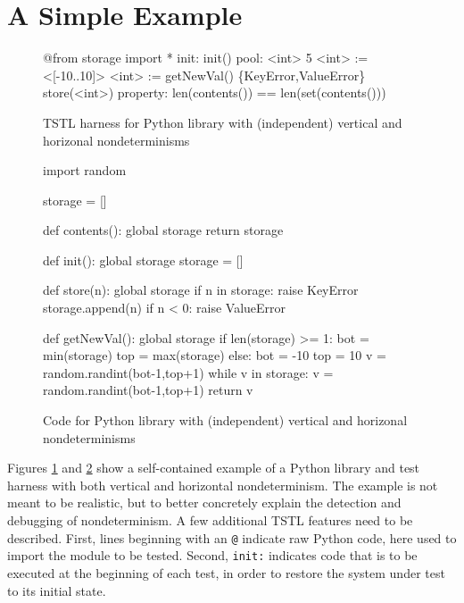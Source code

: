 \section{A Simple Example}

\begin{figure}
{\scriptsize
\begin{code}
@from storage import *
\vspace{0.1in}
init: init()
\vspace{0.1in}
pool: <int> 5
\vspace{0.1in}
<int> := <[-10..10]>
<int> := getNewVal()
\{KeyError,ValueError\} store(<int>)
\vspace{0.1in}
property: len(contents()) == len(set(contents()))
\end{code}
}
\caption{TSTL harness for Python library with (independent) vertical and
  horizonal nondeterminisms}
\label{fig:simpleexample}
\end{figure}

\begin{figure}[t]
  {\scriptsize
\begin{code}
import random

storage = []

def contents():
    global storage
    return storage

def init():
    global storage
    storage = []

def store(n):
    global storage
    if n in storage:
       raise KeyError
    storage.append(n)
    if n < 0:
       raise ValueError

def getNewVal():
    global storage
    if len(storage) >= 1:
        bot = min(storage)
        top = max(storage)
    else:
        bot = -10
        top = 10
    v = random.randint(bot-1,top+1)
    while v in storage:
        v = random.randint(bot-1,top+1)
    return v
  \end{code}
  }
\caption{Code for Python library with (independent) vertical and
  horizonal nondeterminisms}
\label{fig:simpleexamplecode}
\end{figure}

Figures \ref{fig:simpleexample} and \ref{fig:simpleexamplecode} show a self-contained example of a
Python library and test harness with both vertical and horizontal
nondeterminism.  The example is not meant to be realistic, but to
better concretely explain the detection and debugging of
nondeterminism.  A few additional TSTL features need to be described.
First, lines beginning with an {\tt @} indicate raw Python code, here
used to import the module to be tested.  Second, {\tt init:} indicates
code that is to be executed at the beginning of each test, in
order to restore the system under test to its initial state.

